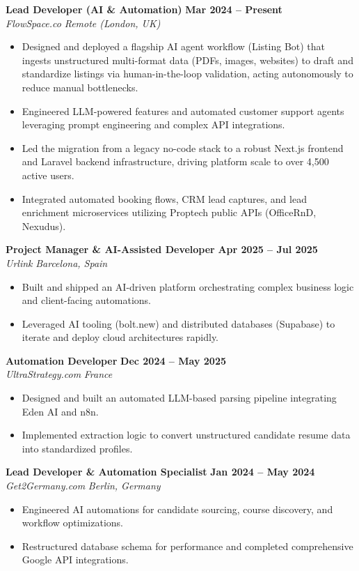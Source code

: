 \documentclass[10pt,a4paper]{article}
\begin{document}
\textbf{Lead Developer (AI \& Automation)} \hfill \textbf{Mar 2024 -- Present} \\
\textit{FlowSpace.co} \hfill \textit{Remote (London, UK)}
\begin{itemize}[leftmargin=0.2in, itemsep=0pt]
    \item Designed and deployed a flagship AI agent workflow (Listing Bot) that ingests unstructured multi-format data (PDFs, images, websites) to draft and standardize listings via human-in-the-loop validation, acting autonomously to reduce manual bottlenecks.
    \item Engineered LLM-powered features and automated customer support agents leveraging prompt engineering and complex API integrations.
    \item Led the migration from a legacy no-code stack to a robust Next.js frontend and Laravel backend infrastructure, driving platform scale to over 4,500 active users.
    \item Integrated automated booking flows, CRM lead captures, and lead enrichment microservices utilizing Proptech public APIs (OfficeRnD, Nexudus).
\end{itemize}

\textbf{Project Manager \& AI-Assisted Developer} \hfill \textbf{Apr 2025 -- Jul 2025} \\
\textit{Urlink} \hfill \textit{Barcelona, Spain}
\begin{itemize}[leftmargin=0.2in, itemsep=0pt]
    \item Built and shipped an AI-driven platform orchestrating complex business logic and client-facing automations.
    \item Leveraged AI tooling (bolt.new) and distributed databases (Supabase) to iterate and deploy cloud architectures rapidly.
\end{itemize}

\textbf{Automation Developer} \hfill \textbf{Dec 2024 -- May 2025} \\
\textit{UltraStrategy.com} \hfill \textit{France}
\begin{itemize}[leftmargin=0.2in, itemsep=0pt]
    \item Designed and built an automated LLM-based parsing pipeline integrating Eden AI and n8n.
    \item Implemented extraction logic to convert unstructured candidate resume data into standardized profiles.
\end{itemize}

\textbf{Lead Developer \& Automation Specialist} \hfill \textbf{Jan 2024 -- May 2024} \\
\textit{Get2Germany.com} \hfill \textit{Berlin, Germany}
\begin{itemize}[leftmargin=0.2in, itemsep=0pt]
    \item Engineered AI automations for candidate sourcing, course discovery, and workflow optimizations.
    \item Restructured database schema for performance and completed comprehensive Google API integrations.
\end{itemize}
\end{document}
